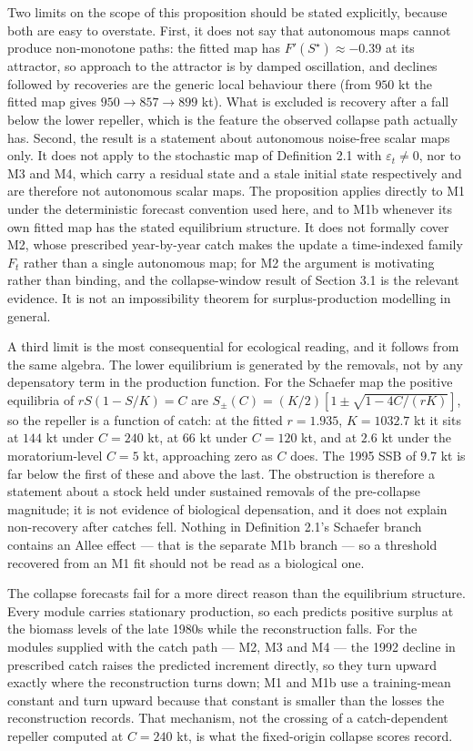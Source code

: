 \documentclass[11pt]{article}
\begin{document}
Two limits on the scope of this proposition should be stated
explicitly, because both are easy to overstate. First, it does not say
that autonomous maps cannot produce non-monotone paths: the fitted map
has \(F'(S^\star) \approx -0.39\) at its attractor, so approach to the
attractor is by damped oscillation, and declines followed by recoveries
are the generic local behaviour there (from \(950\) kt the fitted map
gives \(950 \to 857 \to 899\) kt). What is excluded is recovery after a
fall below the lower repeller, which is the feature the observed
collapse path actually has. Second, the result is a statement about
autonomous noise-free scalar maps only. It does not apply to the
stochastic map of Definition 2.1 with \(\varepsilon_t \neq 0\), nor to
M3 and M4, which carry a residual state and a stale initial state
respectively and are therefore not autonomous scalar maps. The
proposition applies directly to M1 under the deterministic forecast
convention used here, and to M1b whenever its own fitted map has the
stated equilibrium structure. It does not formally cover M2, whose
prescribed year-by-year catch makes the update a time-indexed family
\(F_t\) rather than a single autonomous map; for M2 the argument is
motivating rather than binding, and the collapse-window result of
Section 3.1 is the relevant evidence. It is not an impossibility
theorem for surplus-production modelling in general.

A third limit is the most consequential for ecological reading, and it
follows from the same algebra. The lower equilibrium is generated by the
removals, not by any depensatory term in the production function. For
the Schaefer map the positive equilibria of \(rS(1-S/K)=C\) are
\(S_{\pm}(C) = (K/2)\left[1 \pm \sqrt{1-4C/(rK)}\right]\), so the
repeller is a function of catch: at the fitted \(r = 1.935\),
\(K = 1032.7\) kt it sits at \(144\) kt under \(C = 240\) kt, at
\(66\) kt under \(C = 120\) kt, and at \(2.6\) kt under the
moratorium-level \(C = 5\) kt, approaching zero as \(C\) does. The
1995 SSB of \(9.7\) kt is far below the first of these and above the
last. The obstruction is therefore a statement about a stock held under
sustained removals of the pre-collapse magnitude; it is not evidence of
biological depensation, and it does not explain non-recovery after
catches fell. Nothing in Definition 2.1's Schaefer branch contains an
Allee effect --- that is the separate M1b branch --- so a threshold
recovered from an M1 fit should not be read as a biological one.

The collapse forecasts fail for a more direct reason than the
equilibrium structure. Every module carries stationary production, so
each predicts positive surplus at the biomass levels of the late 1980s
while the reconstruction falls. For the modules supplied with the catch
path --- M2, M3 and M4 --- the 1992 decline in prescribed catch raises
the predicted increment directly, so they turn upward exactly where the
reconstruction turns down; M1 and M1b use a training-mean constant and
turn upward because that constant is smaller than the losses the
reconstruction records. That mechanism, not the crossing of a
catch-dependent repeller computed at \(C = 240\) kt, is what the
fixed-origin collapse scores record.
\end{document}
